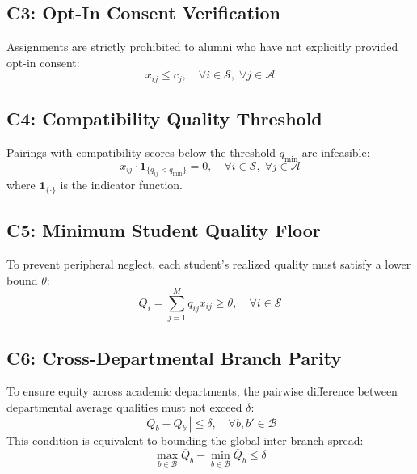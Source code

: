 \subsection{C3: Opt-In Consent Verification}
Assignments are strictly prohibited to alumni who have not explicitly provided opt-in consent:
\begin{equation}
    x_{ij} \le c_j, \quad \forall i \in \mathcal{S}, \; \forall j \in \mathcal{A}
    \label{eq:c3}
\end{equation}

\subsection{C4: Compatibility Quality Threshold}
Pairings with compatibility scores below the threshold $q_{\min}$ are infeasible:
\begin{equation}
    x_{ij} \cdot \mathbf{1}_{\{q_{ij} < q_{\min}\}} = 0, \quad \forall i \in \mathcal{S}, \; \forall j \in \mathcal{A}
    \label{eq:c4}
\end{equation}
where $\mathbf{1}_{\{\cdot\}}$ is the indicator function.

\subsection{C5: Minimum Student Quality Floor}
To prevent peripheral neglect, each student's realized quality must satisfy a lower bound $\theta$:
\begin{equation}
    Q_i = \sum_{j=1}^M q_{ij} x_{ij} \ge \theta, \quad \forall i \in \mathcal{S}
    \label{eq:c5}
\end{equation}

\subsection{C6: Cross-Departmental Branch Parity}
To ensure equity across academic departments, the pairwise difference between departmental average qualities must not exceed $\delta$:
\begin{equation}
    |\overline{Q}_b - \overline{Q}_{b'}| \le \delta, \quad \forall b, b' \in \mathcal{B}
    \label{eq:c6}
\end{equation}
This condition is equivalent to bounding the global inter-branch spread:
\begin{equation}
    \max_{b \in \mathcal{B}} \overline{Q}_b - \min_{b \in \mathcal{B}} \overline{Q}_b \le \delta
    \label{eq:c6_spread}
\end{equation}

